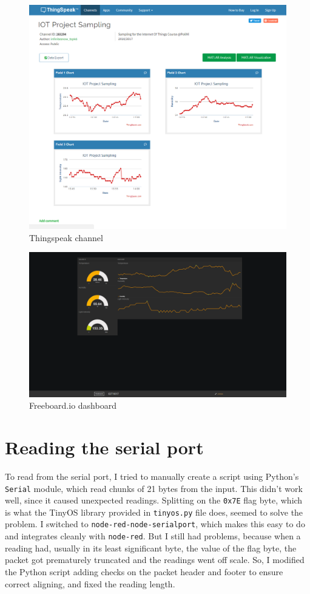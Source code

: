 \documentclass[11pt]{article}
\begin{document}
\begin{figure}
\includegraphics[width=\textwidth]{thingspeak}
\caption{Thingspeak channel}
\label{fig:thingspeak}
\end{figure}

\begin{figure}
\includegraphics[width=\textwidth]{freeboard}
\caption{Freeboard.io dashboard}
\label{fig:freeboard}
\end{figure}

\section{Reading the serial port}
To read from the serial port, I tried to manually create a script using Python's \texttt{Serial} module, which read chunks of 21 bytes from the input. This didn't work well, since it caused unexpected readings. Splitting on the \texttt{0x7E} flag byte, which is what the TinyOS library provided in \texttt{tinyos.py} file does, seemed to solve the problem. I switched to \texttt{node-red-node-serialport}, which makes this easy to do and integrates cleanly with \texttt{node-red}. But I still had problems, because when a reading had, usually in its least significant byte, the value of the flag byte, the packet got prematurely truncated and the readings went off scale. So, I modified the Python script adding checks on the packet header and footer to ensure correct aligning, and fixed the reading length.  
 
\end{document}
